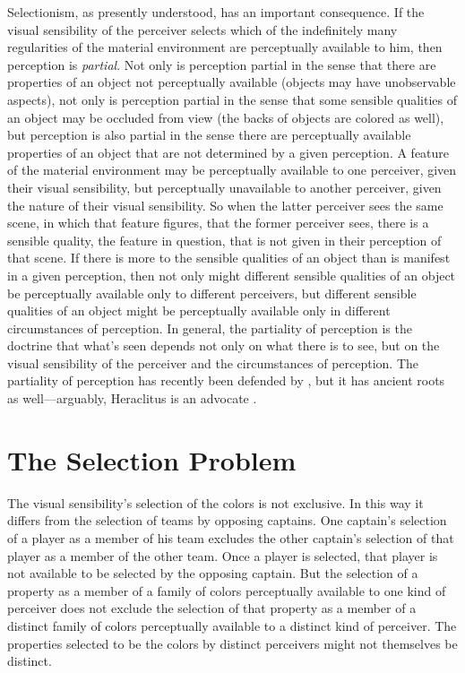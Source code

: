 \documentclass[12pt]{article}
\begin{document}
Selectionism, as presently understood, has an important consequence. If the visual sensibility of the perceiver selects which of the indefinitely many regularities of the material environment are perceptually available to him, then perception is \emph{partial}. Not only is perception partial in the sense that there are properties of an object not perceptually available (objects may have unobservable aspects), not only is perception partial in the sense that some sensible qualities of an object may be occluded from view (the backs of objects are colored as well), but perception is also partial in the sense there are perceptually available properties of an object that are not determined by a given perception. A feature of the material environment may be perceptually available to one perceiver, given their visual sensibility, but perceptually unavailable to another perceiver, given the nature of their visual sensibility. So when the latter perceiver sees the same scene, in which that feature figures, that the former perceiver sees, there is a sensible quality, the feature in question, that is not given in their perception of that scene. If there is more to the sensible qualities of an object than is manifest in a given perception, then not only might different sensible qualities of an object be perceptually available only to different perceivers, but different sensible qualities of an object might be perceptually available only in different circumstances of perception. In general, the partiality of perception is the doctrine that what's seen depends not only on what there is to see, but on the visual sensibility of the perceiver and the circumstances of perception. The partiality of perception has recently been defended by \citet{Hilbert:1987jq}, but it has ancient roots as well---arguably, Heraclitus is an advocate \citep[see][]{Burnyeat:1979mv,Kalderon:2006tg}. 

\section{The Selection Problem}\label{sec:the_selection_problem}

The visual sensibility's selection of the colors is not exclusive. In this way it differs from the selection of teams by opposing captains. One captain's selection of a player as a member of his team excludes the other captain's selection of that player as a member of the other team. Once a player is selected, that player is not available to be selected by the opposing captain. But the selection of a property as a member of a family of colors perceptually available to one kind of perceiver does not exclude the selection of that property as a member of a distinct family of colors perceptually available to a distinct kind of perceiver. The properties selected to be the colors by distinct perceivers might not themselves be distinct.
\end{document}
